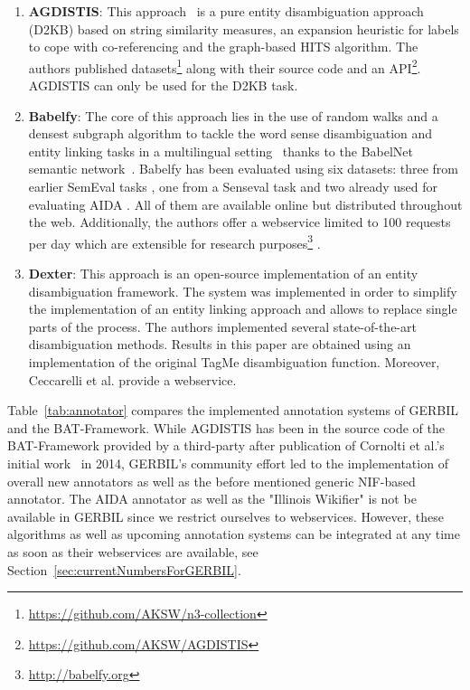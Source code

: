 \begin{enumerate}
\item \textbf{AGDISTIS}: This approach~\cite{agdistis_iswc} is a pure entity disambiguation approach (D2KB) based on string similarity measures, an expansion heuristic for labels to cope with co-referencing and the graph-based HITS algorithm.
The authors published datasets\footnote{\url{https://github.com/AKSW/n3-collection}} along with their source code and an API\footnote{\url{https://github.com/AKSW/AGDISTIS}}.
AGDISTIS can only be used for the D2KB task.

\item \textbf{Babelfy}: The core of this approach lies in the use of random walks and a densest subgraph algorithm to tackle the word sense disambiguation and entity linking tasks in a multilingual setting~\cite{babelfy} thanks to the BabelNet semantic network~\cite{NavigliPonzetto:12aij}.
Babelfy has been evaluated using six datasets: three from earlier SemEval tasks \cite{pradhan2007semeval,NavigliLH:2007,Naviglietal:13}, one from a Senseval task \cite{snyder2004english} and two already used for evaluating AIDA \cite{AIDA,HoffartSNTW:2012}.
All of them are available online but distributed throughout the web. 
Additionally, the authors offer a webservice limited to 100 requests per day which are extensible for research purposes\footnote{\url{http://babelfy.org}} \cite{BabelfyAPI}.


\item \textbf{Dexter}: This approach \cite{ceccarelli2013dexter} is an open-source implementation of an entity disambiguation framework.
The system was implemented in order to simplify the implementation of an entity linking approach and allows to replace single parts of the process.
The authors implemented several state-of-the-art disambiguation methods.
Results in this paper are obtained using an implementation of the original TagMe disambiguation function.
Moreover, Ceccarelli et al. provide %
a webservice.
\end{enumerate}



Table~\ref{tab:annotator} compares the implemented annotation systems of GERBIL and the BAT-Framework.
While AGDISTIS has been in the source code of the BAT-Framework provided by a third-party after publication of Cornolti et al.'s initial work~\cite{cornolti} in 2014, GERBIL's community effort led to the implementation of overall \numberOfadditionalAnnotators new annotators as well as the before mentioned generic NIF-based annotator.
The AIDA annotator as well as the "Illinois Wikifier" is not be available in GERBIL since we restrict ourselves to webservices.
However, these algorithms as well as upcoming annotation systems can be integrated at any time as soon as their webservices are available, see Section~\ref{sec:currentNumbersForGERBIL}.


